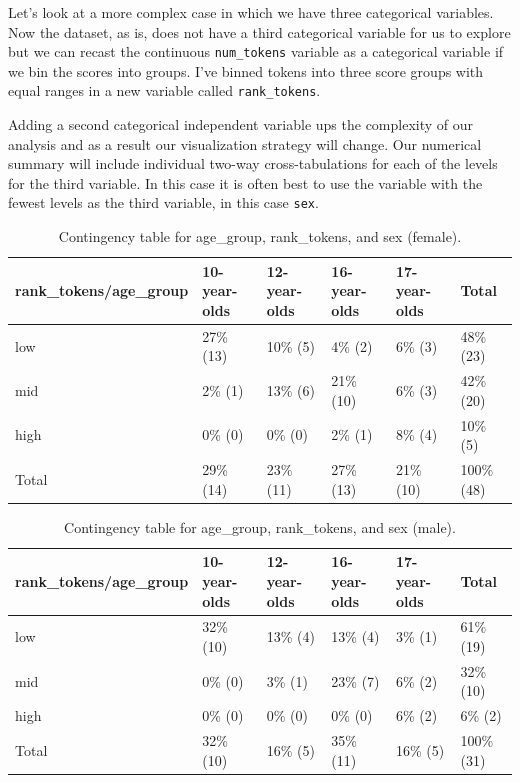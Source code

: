 \documentclass[
  letterpaper,
]{scrbook}
\begin{document}
Let's look at a more complex case in which we have three categorical
variables. Now the dataset, as is, does not have a third categorical
variable for us to explore but we can recast the continuous
\texttt{num\_tokens} variable as a categorical variable if we bin the
scores into groups. I've binned tokens into three score groups with
equal ranges in a new variable called \texttt{rank\_tokens}.

Adding a second categorical independent variable ups the complexity of
our analysis and as a result our visualization strategy will change. Our
numerical summary will include individual two-way cross-tabulations for
each of the levels for the third variable. In this case it is often best
to use the variable with the fewest levels as the third variable, in
this case \texttt{sex}.

\hypertarget{tbl-summaries-multivariate-categorical-table-belc-female}{}
\begin{table}
\caption{\label{tbl-summaries-multivariate-categorical-table-belc-female}Contingency table for age\_group, rank\_tokens, and sex (female). }\tabularnewline

\centering
\begin{tabular}{llllll}
\toprule
rank\_tokens/age\_group & 10-year-olds & 12-year-olds & 16-year-olds & 17-year-olds & Total\\
\midrule
low & 27\% (13) & 10\%  (5) & 4\%  (2) & 6\%  (3) & 48\% (23)\\
mid & 2\%  (1) & 13\%  (6) & 21\% (10) & 6\%  (3) & 42\% (20)\\
high & 0\%  (0) & 0\%  (0) & 2\%  (1) & 8\%  (4) & 10\%  (5)\\
Total & 29\% (14) & 23\% (11) & 27\% (13) & 21\% (10) & 100\% (48)\\
\bottomrule
\end{tabular}
\end{table}

\hypertarget{tbl-summaries-multivariate-categorical-table-belc-male}{}
\begin{table}
\caption{\label{tbl-summaries-multivariate-categorical-table-belc-male}Contingency table for age\_group, rank\_tokens, and sex (male). }\tabularnewline

\centering
\begin{tabular}{llllll}
\toprule
rank\_tokens/age\_group & 10-year-olds & 12-year-olds & 16-year-olds & 17-year-olds & Total\\
\midrule
low & 32\% (10) & 13\% (4) & 13\%  (4) & 3\% (1) & 61\% (19)\\
mid & 0\%  (0) & 3\% (1) & 23\%  (7) & 6\% (2) & 32\% (10)\\
high & 0\%  (0) & 0\% (0) & 0\%  (0) & 6\% (2) & 6\%  (2)\\
Total & 32\% (10) & 16\% (5) & 35\% (11) & 16\% (5) & 100\% (31)\\
\bottomrule
\end{tabular}
\end{table}
\end{document}
